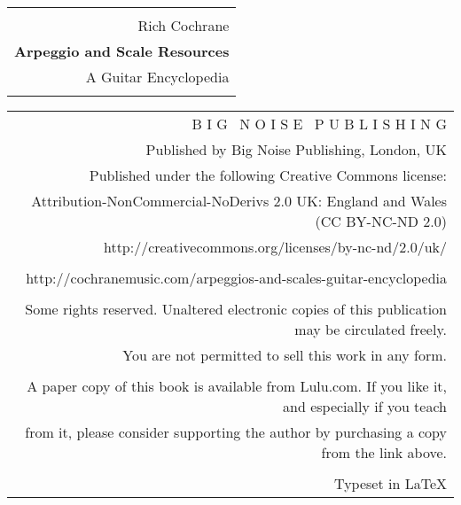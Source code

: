\documentclass[english]{./gbook}
\begin{document}
	\marginparpush=0pt
	\marginparsep=0pt
	\oddsidemargin=18pt
	\evensidemargin=18pt
	\marginparwidth=54pt
	\headheight=0pt
	\headsep=45pt
	\textwidth=424pt
	\textheight=565pt



\frontmatter
\pagestyle{empty}
\vspace*{120pt}
\begin{center}
\begin{tabular}{r}\hline
\\
{\large Rich Cochrane
} \\
\textbf{{\Huge
Arpeggio and Scale Resources}} \\ 
{\large A Guitar Encyclopedia
} \\
\\
\hline
\end{tabular}
\end{center}

\newpage
\pagestyle{empty}
\vspace*{250pt}
\begin{center}
\begin{tabular}{r}
B I G \ N O I S E \ P U B L I S H I N G\\
Published by Big Noise Publishing, London, UK\\
Published under the following Creative Commons license:\\
Attribution-NonCommercial-NoDerivs 2.0 UK: England and Wales (CC BY-NC-ND 2.0)\\
http://creativecommons.org/licenses/by-nc-nd/2.0/uk/\\
\\
http://cochranemusic.com/arpeggios-and-scales-guitar-encyclopedia\\
\\
Some rights reserved. Unaltered electronic copies of this publication may be circulated freely. \\
You are not permitted to sell this work in any form.\\
\\
A paper copy of this book is available from Lulu.com. If you like it, and especially if you teach \\
from it, please consider supporting the author by purchasing a copy from the link above.\\
\\
Typeset in \LaTeX\\
\end{tabular}
\end{center}
\pagestyle{empty}
\end{document}
